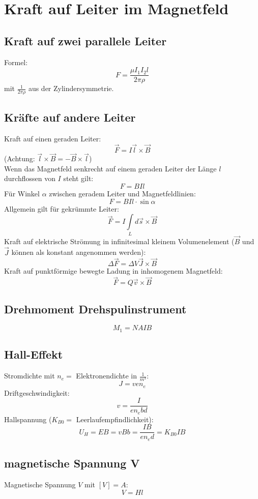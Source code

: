 \documentclass[12pt,a4paper]{article}
\begin{document}
\section{Kraft auf Leiter im Magnetfeld}
\subsection{Kraft auf zwei parallele Leiter}
Formel:
\[F = \frac{\mu I_1 I_2 l}{2\pi \rho}\]
mit $\frac{1}{2\pi \rho}$ aus der Zylindersymmetrie.

\subsection{Kräfte auf andere Leiter}
Kraft auf einen geraden Leiter:
\[\vec{F} = I \vec{l} \times \vec{B}\]
(Achtung: $\vec{l}\times \vec{B} = - \vec{B} \times \vec{l}$)\\
Wenn das Magnetfeld senkrecht auf einem geraden Leiter der Länge $l$ durchflossen von $I$ steht gilt:
\[F = B I l\]
Für Winkel $\alpha$ zwischen geradem Leiter und Magnetfeldlinien:
\[F = B I l \cdot \sin \alpha\]
Allgemein gilt für gekrümmte Leiter:
\[\vec{F} = I\int\limits_L{d\vec{s}\times \vec{B}}\]
Kraft auf elektrische Strömung in infinitesimal kleinem Volumenelement ($\vec{B}$ und $\vec{J}$ können als konstant angenommen werden):
\[\Delta \vec{F} = \Delta V \vec{J}\times \vec{B}\]
Kraft auf punktförmige bewegte Ladung in inhomogenem Magnetfeld:
\[\vec{F} = Q \vec{v} \times \vec{B}\]

\subsection{Drehmoment Drehspulinstrument}
\[M_1 = N A I B\]

\subsection{Hall-Effekt}
Stromdichte mit $n_e = $ Elektronendichte in $\frac{1}{m^3}$:
\[J = v e n_e\]
Driftgeschwindigkeit:
\[ v = \frac{I}{e n_e bd}\]
Hallspannung ($K_{B0} = $ Leerlaufempfindlichkeit):
\[ U_H = EB = vBb = \frac{I B}{e n_e d} = K_{B0} IB\]

\subsection{magnetische Spannung V}
Magnetische Spannung $V$ mit $[V] = A$:
\[V = Hl\]
\end{document}
